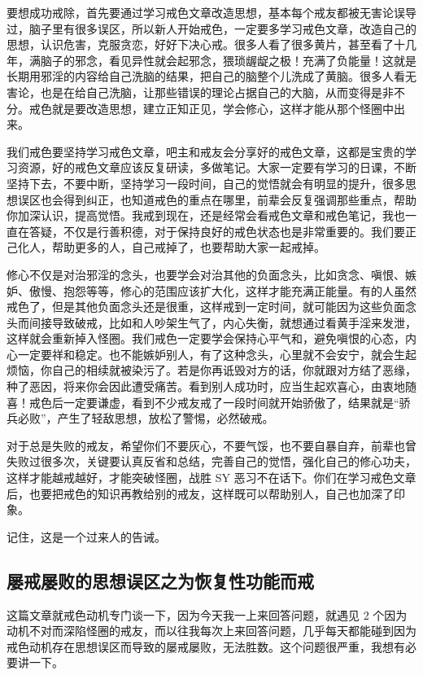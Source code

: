 \documentclass{ctexart}
\begin{document}
要想成功戒除，首先要通过学习戒色文章改造思想，基本每个戒友都被无害论误导过，脑子里有很多误区，所以新人开始戒色，一定要多学习戒色文章，改造自己的思想，认识危害，克服贪恋，好好下决心戒。很多人看了很多黄片，甚至看了十几年，满脑子的邪念，看见异性就会起邪念，猥琐龌龊之极！充满了负能量！这就是长期用邪淫的内容给自己洗脑的结果，把自己的脑整个儿洗成了黄脑。很多人看无害论，也是在给自己洗脑，让那些错误的理论占据自己的大脑，从而变得是非不分。戒色就是要改造思想，建立正知正见，学会修心，这样才能从那个怪圈中出来。

我们戒色要坚持学习戒色文章，吧主和戒友会分享好的戒色文章，这都是宝贵的学习资源，好的戒色文章应该反复研读，多做笔记。大家一定要有学习的日课，不断坚持下去，不要中断，坚持学习一段时间，自己的觉悟就会有明显的提升，很多思想误区也会得到纠正，也知道戒色的重点在哪里，前辈会反复强调那些重点，帮助你加深认识，提高觉悟。我戒到现在，还是经常会看戒色文章和戒色笔记，我也一直在答疑，不仅是行善积德，对于保持良好的戒色状态也是非常重要的。我们要正己化人，帮助更多的人，自己戒掉了，也要帮助大家一起戒掉。

修心不仅是对治邪淫的念头，也要学会对治其他的负面念头，比如贪念、嗔恨、嫉妒、傲慢、抱怨等等，修心的范围应该扩大化，这样才能充满正能量。有的人虽然戒色了，但是其他负面念头还是很重，这样戒到一定时间，就可能因为这些负面念头而间接导致破戒，比如和人吵架生气了，内心失衡，就想通过看黄手淫来发泄，这样就会重新掉入怪圈。我们戒色一定要学会保持心平气和，避免嗔恨的心态，内心一定要祥和稳定。也不能嫉妒别人，有了这种念头，心里就不会安宁，就会生起烦恼，你自己的相续就被染污了。若是你再诋毁对方的话，你就跟对方结了恶缘，种了恶因，将来你会因此遭受痛苦。看到别人成功时，应当生起欢喜心，由衷地随喜！戒色后一定要谦虚，看到不少戒友戒了一段时间就开始骄傲了，结果就是“骄兵必败”，产生了轻敌思想，放松了警惕，必然破戒。

对于总是失败的戒友，希望你们不要灰心，不要气馁，也不要自暴自弃，前辈也曾失败过很多次，关键要认真反省和总结，完善自己的觉悟，强化自己的修心功夫，这样才能越戒越好，才能突破怪圈，战胜 SY 恶习不在话下。你们在学习戒色文章后，也要把戒色的知识再教给别的戒友，这样既可以帮助别人，自己也加深了印象。

记住，这是一个过来人的告诫。

\subsection{屡戒屡败的思想误区之为恢复性功能而戒}

这篇文章就戒色动机专门谈一下，因为今天我一上来回答问题，就遇见 2 个因为动机不对而深陷怪圈的戒友，而以往我每次上来回答问题，几乎每天都能碰到因为戒色动机存在思想误区而导致的屡戒屡败，无法胜数。这个问题很严重，我想有必要讲一下。
\end{document}
